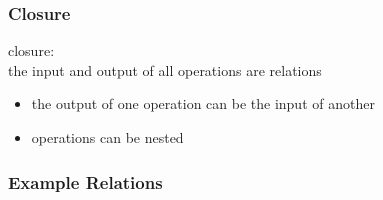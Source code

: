 \documentclass[dvipsnames]{beamer}
\theoremstyle{plain}
\begin{document}
\begin{frame}
  \frametitle{Closure}

  \begin{definition}
    \alert{closure}:\\
      the input and output of all operations are relations
  \end{definition}

  \pause
  \begin{itemize}
    \item the output of one operation can be the input of another
    \item operations can be nested
  \end{itemize}
\end{frame}

\begin{frame}
  \frametitle{Example Relations}


\end{frame}
\end{document}
